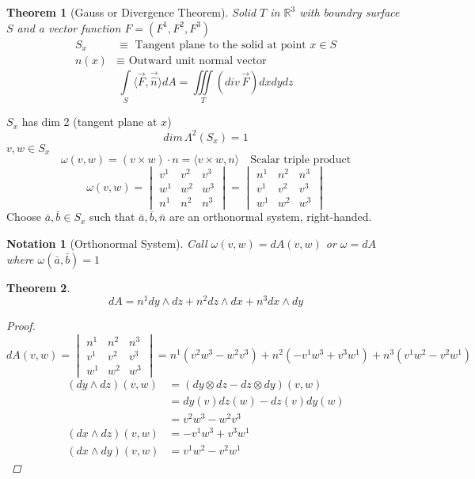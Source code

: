 \documentclass[11pt]{article}
\def\RR{\mathbb{R}}
\newtheorem{theorem}{Theorem}[section]
\newtheorem*{notation}{Notation}
\begin{document}
\begin{theorem}[Gauss or Divergence Theorem]
Solid $T$ in $\RR^3$ with boundry surface $S$ and a vector function $F = (F^1, F^2, F^3)$
\begin{align*}
S_x &\equiv \text{ Tangent plane to the solid at point } x \in S\\
n(x) & \equiv \text{ Outward unit normal vector}
\end{align*}
\[\int\limits_{S}\langle \vec{F}, \vec{\hat{n}} \rangle dA = \iiint\limits_{T} (div \, \vec{F}) dxdydz\]
\end{theorem}
$S_x$ has dim 2 (tangent plane at $x$)
\[dim\,\Lambda^2(S_x) =1\]
$v,w \in S_x$ 
\[\omega(v,w) = (v \times w)\cdot n = \langle v \times w , n \rangle \quad \text{Scalar triple product}\]
\[\omega(v,w) = \begin{vmatrix} v^1 &v^2 &v^3 \\ w^1 &w^2 &w^3 \\ n^1 &n^2 &n^3 \end{vmatrix}= \begin{vmatrix} 
n^1 &n^2 &n^3 \\ v^1 &v^2 &v^3 \\ w^1 &w^2 &w^3 \end{vmatrix}\]
Choose $\bar{a}, \bar{b} \in S_x$ such that $\bar{a}, \bar{b}, \bar{n}$ are an orthonormal system, right-handed. 
\begin{notation}[Orthonormal System]
Call $\omega(v,w) = dA(v,w)$ or $\omega = dA$ where $\omega(\bar{a}, \bar{b}) = 1$ \end{notation}

\begin{theorem}
\[dA = n^1dy\wedge dz+ n^2dz\wedge dx +n^3dx\wedge dy\]
\begin{proof}
\[dA(v,w) = \begin{vmatrix} n^1 &n^2 &n^3 \\ v^1 &v^2 &v^3 \\ w^1 &w^2 &w^3 \end{vmatrix} =n^1(v^2w^3 - w^2v^3) + n^2(-v^1w^3 + v^3w^1) + n^3(v^1w^2 - v^2w^1)\]
\begin{align*}
(dy \wedge dz)(v,w) &= (dy \otimes dz - dz \otimes dy)(v,w)\\
&= dy(v)dz(w) - dz(v)dy(w)\\
&= v^2w^3 - w^2v^3\\
(dx \wedge dz)(v,w) &=-v^1w^3 + v^3w^1\\
(dx \wedge dy)(v,w) &=v^1w^2 - v^2w^1
\end{align*}
\end{proof}
\end{theorem}
\end{document}
